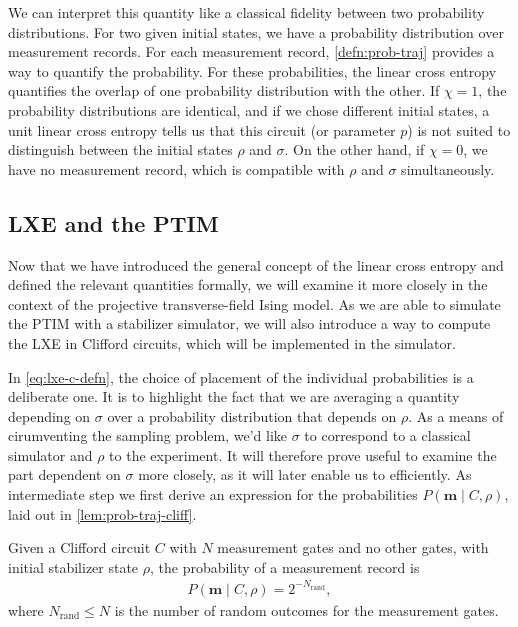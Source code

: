We can interpret this quantity like a classical fidelity between two
probability distributions. For two given initial states, we have a probability
distribution over measurement records. For each measurement record,
\cref{defn:prob-traj} provides a way to quantify the probability. For these
probabilities, the linear cross entropy quantifies the overlap of one
probability distribution with the other. If $\chi = 1$, the probability
distributions are identical, and if we chose different initial states, a unit
linear cross entropy tells us that this circuit (or parameter $p$) is not
suited to distinguish between the initial states $\rho$ and $\sigma$. On the
other hand, if $\chi=0$, we have no measurement record, which is compatible
with $\rho$ and $\sigma$ simultaneously.

\subsection{LXE and the PTIM}\label{sec:lxe-for-ptim}
Now that we have introduced the general concept of the linear cross entropy and
defined the relevant quantities formally, we will examine it more closely in
the context of the projective transverse-field Ising model. As we are able to
simulate the PTIM with a stabilizer simulator, we will also introduce a way to
compute the LXE in Clifford circuits, which will be implemented in the
simulator.

In \cref{eq:lxe-c-defn}, the choice of placement of the individual
probabilities is a deliberate one. It is to highlight the fact that we are
averaging a quantity depending on $\sigma$ over a probability distribution that
depends on $\rho$. As a means of cirumventing the sampling problem, we'd like
$\sigma$ to correspond to a classical simulator and $\rho$ to the experiment.
It will therefore prove useful to examine the part dependent on $\sigma$ more
closely, as it will later enable us to efficiently. 
As intermediate step we first derive an
expression for the probabilities $P\left( \mathbf{m} \mid C, \rho \right)$,
laid out in \cref{lem:prob-traj-cliff}.
\begin{lem}\label{lem:prob-traj-cliff}
  Given a Clifford circuit $C$ with $N$ measurement gates and no other gates, with initial
  stabilizer state $\rho$, the probability of a measurement record is
  \begin{align}
    P\left(\mathbf{m} \mid C, \rho\right) = 2^{-N_\mathrm{rand}}
  ,\end{align}
  where $N_\mathrm{rand} \leq N$ is the number of random outcomes for the
  measurement gates.
\end{lem}

